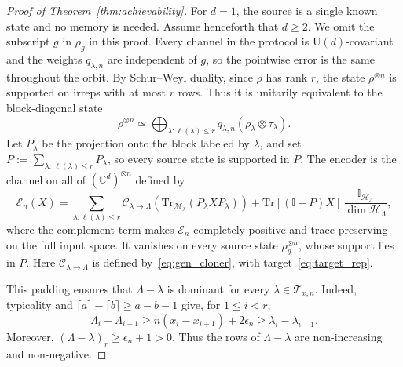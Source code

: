 \documentclass[a4paper,onecolumn,11pt]{quantumarticle}
\def\h{\mathcal{H}}
\def\id{\mathbb{I}}
\newcommand*{\Tr}{\mathrm{Tr}}
\def\map{\mathcal}
\begin{document}
\begin{proof}[Proof of Theorem~\ref{thm:achievability}]
For $d=1$, the source is a single known state and no memory is needed.
Assume henceforth that $d\ge2$.
We omit the subscript $g$ in $\rho_g$ in this proof. Every channel in the
protocol is $\mathrm U(d)$-covariant and the weights $q_{\lambda,n}$ are
independent of $g$, so the pointwise error is the same throughout the orbit.
By Schur--Weyl duality, since $\rho$ has rank $r$, the state
$\rho^{\otimes n}$ is supported on irreps with at most $r$ rows. Thus it is
unitarily equivalent to the block-diagonal state
\begin{equation}
    \rho^{\otimes n}\simeq\bigoplus_{\lambda : \ell(\lambda) \le r}
    q_{\lambda,n}\left(\rho_\lambda\otimes\tau_\lambda\right).
\end{equation}
Let $P_\lambda$ be the projection onto the block labeled by $\lambda$, and set $P:=\sum_{\lambda:\,\ell(\lambda)\le r}P_\lambda$, so every source state is supported in $P$.
The encoder is the channel on all of $(\mathbb C^d)^{\otimes n}$ defined by
\begin{equation}\label{eq:optimal_encoder}
    \map{E}_n(X)
    =\sum_{\lambda : \ell(\lambda) \le r}
    \map{C}_{\lambda\to \Lambda}\!\left(
    \Tr_{\map{M}_{\lambda}}(P_\lambda X P_\lambda)\right)
    +\Tr[(\id-P)X]\,
    \frac{\id_{\h_{\Lambda}}}{\dim\h_{\Lambda}},
\end{equation}
where the complement term makes $\map E_n$ completely positive and trace preserving on the full input space. It vanishes on every source state $\rho_g^{\otimes n}$, whose support lies in $P$.
Here $\map C_{\lambda\to\Lambda}$ is defined
by~\eqref{eq:gen_cloner}, with target~\eqref{eq:target_rep}.

This padding ensures that $\Lambda-\lambda$ is dominant for every
$\lambda\in\mathcal T_{x,n}$. Indeed, typicality and
$\lceil a\rceil-\lceil b\rceil\ge a-b-1$ give, for $1\le i<r$,
\begin{equation}
    \Lambda_i-\Lambda_{i+1}
    \ge n(x_i-x_{i+1})+2\epsilon_n
    \ge \lambda_i-\lambda_{i+1}.
\end{equation}
Moreover, $(\Lambda-\lambda)_r\ge\epsilon_n+1>0$.
Thus the rows of $\Lambda-\lambda$ are non-increasing and non-negative.



\end{proof}
\end{document}
